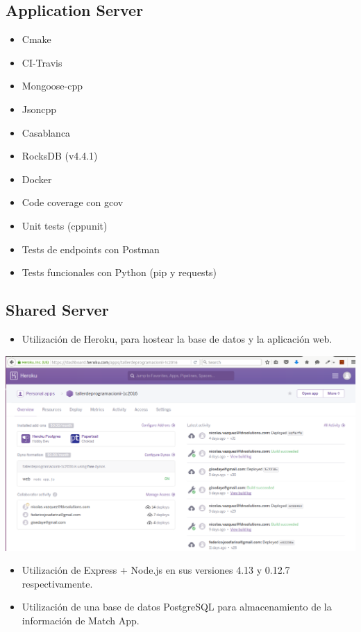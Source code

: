 \documentclass[letterpaper,10pt,english]{sphinxmanual}
\begin{document}
\subsection{Application Server}
\label{manuals:application-server}\begin{itemize}
\item {} 
Cmake

\item {} 
CI-Travis

\item {} 
Mongoose-cpp

\item {} 
Jsoncpp

\item {} 
Casablanca

\item {} 
RocksDB (v4.4.1)

\item {} 
Docker

\item {} 
Code coverage con gcov

\item {} 
Unit tests (cppunit)

\item {} 
Tests de endpoints con Postman

\item {} 
Tests funcionales con Python (pip y requests)

\end{itemize}


\subsection{Shared Server}
\label{manuals:shared-server}\begin{itemize}
\item {} 
Utilización de Heroku, para hostear la base de datos y la aplicación web.

\end{itemize}

\includegraphics{heroku.png}
\begin{itemize}
\item {} 
Utilización de Express + Node.js en sus versiones 4.13 y 0.12.7 respectivamente.

\item {} 
Utilización de una base de datos PostgreSQL para almacenamiento de la información de Match App.

\end{itemize}
\end{document}
